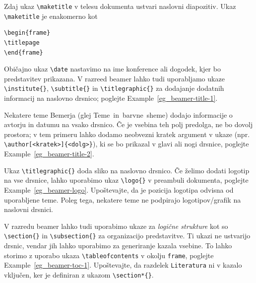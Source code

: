 Zdaj ukaz \texttt{{\textbackslash}maketitle} v telesu dokumenta ustvari naslovni diapozitiv. Ukaz \texttt{{\textbackslash}maketitle} je enakomerno kot

\begin{verbatim}
\begin{frame}
\titlepage
\end{frame}
\end{verbatim}

Običajno ukaz \texttt{{\textbackslash}date} nastavimo na ime konference ali dogodek, kjer bo predstavitev prikazana.
V razreed beamer lahko tudi uporabljamo ukaze \texttt{{\textbackslash}institute\{\}}, \texttt{{\textbackslash}subtitle\{\}} in \texttt{{\textbackslash}titlegraphic\{\}} za dodajanje dodatnih informacij na naslovno drsnico; poglejte Example~\ref{eg_beamer-title-1}.

\begin{example}\label{eg_beamer-title-1}\end{example}Nekatere teme Bemerja (glej Teme~in~barvne~sheme) dodajo informacije o avtorju in datumu na vsako drsnico.
Če je vsebina teh polj predolga, ne bo dovolj prostora; v tem primeru lahko dodamo neobvezni kratek argument v ukaze (npr. \texttt{{\textbackslash}author[\textless kratek\textgreater ]\{\textless dolg\textgreater \}}), ki se bo prikazal v glavi ali nogi drsnice, poglejte Example~\ref{eg_beamer-title-2}.

\begin{example}\label{eg_beamer-title-2}\end{example}Ukaz \texttt{{\textbackslash}titlegraphic\{\}} doda sliko na naslovno drsnico.
Če želimo dodati logotip na vse drsnice, lahko uporabimo ukaz \texttt{{\textbackslash}logo\{\}} v preambuli dokumenta, poglejte Example~\ref{eg_beamer-logo}.
Upoštevajte, da je pozicija logotipa odvisna od uporabljene teme. Poleg tega, nekatere teme ne podpirajo logotipov/grafik na naslovni drsnici.

\begin{example}\label{eg_beamer-logo}\end{example}V razredu beamer lahko tudi uporabimo ukaze za \textit{logične strukture} kot so \texttt{{\textbackslash}section\{\}} in \texttt{{\textbackslash}subsection\{\}} za organizacijo predstavitve.
Ti ukazi ne ustvarijo drsnic, vendar jih lahko uporabimo za generiranje kazala vsebine.
To lahko storimo z uporabo ukaza \texttt{{\textbackslash}tableofcontents} v okolju \texttt{frame}, poglejte Example~\ref{eg_beamer-toc-1}.
Upoštevajte, da razdelek \texttt{Literatura} ni v kazalo vključen, ker je definiran z ukazom \texttt{{\textbackslash}section*\{\}}.


